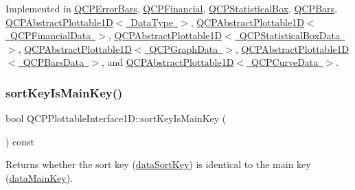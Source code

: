 Implemented in \mbox{\hyperlink{class_q_c_p_error_bars_ac32f9e729cb205ca56821f9b663472c0}{Q\+C\+P\+Error\+Bars}}, \mbox{\hyperlink{class_q_c_p_financial_a3c5beb1ab028a1dba845fc9dcffc7cf4}{Q\+C\+P\+Financial}}, \mbox{\hyperlink{class_q_c_p_statistical_box_a42febad6ad5e924a151434cc434b4ffc}{Q\+C\+P\+Statistical\+Box}}, \mbox{\hyperlink{class_q_c_p_bars_ab03bb6125c3e983b89d694f75ce6b3d5}{Q\+C\+P\+Bars}}, \mbox{\hyperlink{class_q_c_p_abstract_plottable1_d_ac385c38a79e419ed3600c2ee398fd216}{Q\+C\+P\+Abstract\+Plottable1\+D$<$ Data\+Type $>$}}, \mbox{\hyperlink{class_q_c_p_abstract_plottable1_d_ac385c38a79e419ed3600c2ee398fd216}{Q\+C\+P\+Abstract\+Plottable1\+D$<$ Q\+C\+P\+Financial\+Data $>$}}, \mbox{\hyperlink{class_q_c_p_abstract_plottable1_d_ac385c38a79e419ed3600c2ee398fd216}{Q\+C\+P\+Abstract\+Plottable1\+D$<$ Q\+C\+P\+Statistical\+Box\+Data $>$}}, \mbox{\hyperlink{class_q_c_p_abstract_plottable1_d_ac385c38a79e419ed3600c2ee398fd216}{Q\+C\+P\+Abstract\+Plottable1\+D$<$ Q\+C\+P\+Graph\+Data $>$}}, \mbox{\hyperlink{class_q_c_p_abstract_plottable1_d_ac385c38a79e419ed3600c2ee398fd216}{Q\+C\+P\+Abstract\+Plottable1\+D$<$ Q\+C\+P\+Bars\+Data $>$}}, and \mbox{\hyperlink{class_q_c_p_abstract_plottable1_d_ac385c38a79e419ed3600c2ee398fd216}{Q\+C\+P\+Abstract\+Plottable1\+D$<$ Q\+C\+P\+Curve\+Data $>$}}.

\mbox{\label{class_q_c_p_plottable_interface1_d_a229e65e7ab968dd6cd0e259fa504b79d}} 
\subsubsection{\texorpdfstring{sort\+Key\+Is\+Main\+Key()}{sortKeyIsMainKey()}}
{\footnotesize\ttfamily bool Q\+C\+P\+Plottable\+Interface1\+D\+::sort\+Key\+Is\+Main\+Key (\begin{DoxyParamCaption}{ }\end{DoxyParamCaption}) const\hspace{0.3cm}{\ttfamily [pure virtual]}}

Returns whether the sort key (\mbox{\hyperlink{class_q_c_p_plottable_interface1_d_afdc92f9f01e7e35f2e96b2ea9dc14ae7}{data\+Sort\+Key}}) is identical to the main key (\mbox{\hyperlink{class_q_c_p_plottable_interface1_d_a2bd60daaac046945fead558cbd83cf73}{data\+Main\+Key}}).

